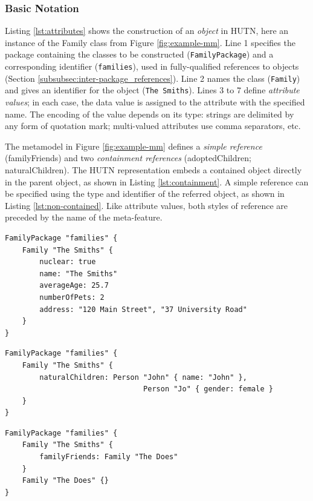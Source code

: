 \subsubsection{Basic Notation}
Listing \ref{lst:attributes} shows the construction of an \emph{object} in HUTN, here an instance of the Family class from Figure \ref{fig:example-mm}. Line 1 specifies the package containing the classes to be constructed (\texttt{FamilyPackage}) and a corresponding identifier (\texttt{families}), used in fully-qualified references to objects (Section \ref{subsubsec:inter-package_references}). Line 2 names the class (\texttt{Family}) and gives an identifier for the object (\texttt{The Smiths}). Lines 3 to 7 define \emph{attribute values}; in each case, the data value is assigned to the attribute with the specified name. The encoding of the value depends on its type: strings are delimited by any form of quotation mark; multi-valued attributes use comma separators, etc.

The metamodel in Figure \ref{fig:example-mm} defines a \emph{simple reference} (familyFriends) and two \emph{containment references} (adoptedChildren; naturalChildren). The HUTN representation embeds a contained object directly in the parent object, as shown in Listing \ref{lst:containment}. A simple reference can be specified using the type and identifier of the referred object, as shown in Listing \ref{lst:non-contained}. Like attribute values, both styles of reference are preceded by the name of the meta-feature.

\begin{lstlisting}[caption=Specifying attributes with HUTN., label=lst:attributes, language=HutnFamilies]
FamilyPackage "families" {
    Family "The Smiths" {
        nuclear: true
        name: "The Smiths"
        averageAge: 25.7
        numberOfPets: 2
        address: "120 Main Street", "37 University Road"
    }
}
\end{lstlisting}

\begin{lstlisting}[caption=Instantiation of naturalChildren -- a HUTN containment reference., label=lst:containment, language=HutnFamilies]
FamilyPackage "families" {
    Family "The Smiths" {
        naturalChildren: Person "John" { name: "John" },
                                Person "Jo" { gender: female }
    }
}
\end{lstlisting}


\begin{lstlisting}[caption=Specifying a simple reference with HUTN., label=lst:non-contained, language=HutnFamilies]
FamilyPackage "families" {
    Family "The Smiths" {
        familyFriends: Family "The Does"
    }
    Family "The Does" {}
}
\end{lstlisting}


